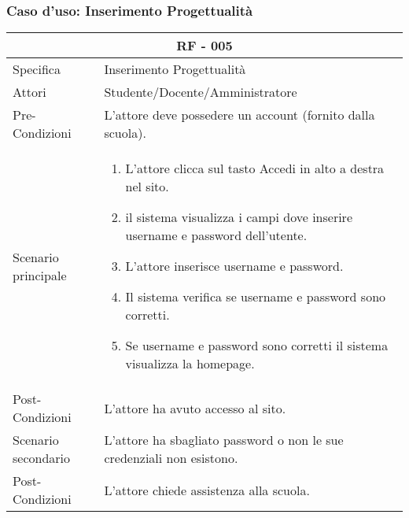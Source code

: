 \documentclass{article}
\begin{document}
\subsubsection{\textbf{Caso d'uso: Inserimento Progettualità}}
\begin{tabular}{ |p{3cm}|p{9cm}|  }
	\hline
	\multicolumn{2}{|c|}{\textbf{RF - 005}} \\
	\hline
	Specifica& Inserimento Progettualità\\
	\hline
	Attori& Studente/Docente/Amministratore\\
	\hline
	Pre-Condizioni& L'attore deve possedere un account (fornito dalla scuola).\\
	\hline
	Scenario principale& \begin{enumerate}
		\item L'attore clicca sul tasto Accedi in alto a destra nel sito.
		\item il sistema visualizza i campi dove inserire username e password dell'utente.
		\item L'attore inserisce username e password.
		\item Il sistema verifica se username e password sono corretti.
		\item Se username e password sono corretti il sistema visualizza la homepage.
	\end{enumerate}\\
	\hline
	Post-Condizioni& L'attore ha avuto accesso al sito.\\
	\hline
	Scenario secondario& L'attore ha sbagliato password o non le sue credenziali non esistono.\\
	\hline
	Post-Condizioni& L'attore chiede assistenza alla scuola.\\
	\hline
\end{tabular}
\end{document}
